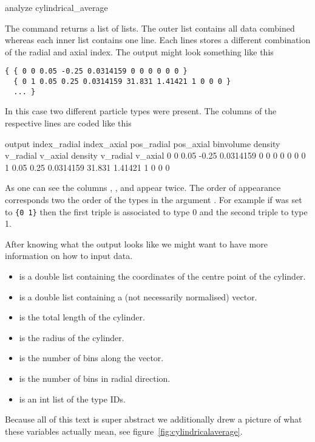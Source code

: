 \begin{essyntax}
  analyze cylindrical_average  
     
\end{essyntax}

The command returns a list of lists.  The outer list contains all data
combined whereas each inner list contains one line.  Each lines stores
a different combination of the radial and axial index.  The output
might look something like this
\begin{verbatim}
{ { 0 0 0.05 -0.25 0.0314159 0 0 0 0 0 0 }
  { 0 1 0.05 0.25 0.0314159 31.831 1.41421 1 0 0 0 }
  ... }
\end{verbatim}
In this case two different particle types were present.  The columns
of the respective lines are coded like this
\begin{SaveVerbatim}{output}
index_radial index_axial pos_radial pos_axial binvolume density v_radial v_axial density v_radial v_axial
0            0           0.05       -0.25     0.0314159 0       0        0       0       0        0
0            1           0.05       0.25      0.0314159 31.831  1.41421  1       0       0        0
\end{SaveVerbatim}
\bigbreak\noindent%
\bigbreak\noindent%
%
As one can see the columns , , and
 appear twice.  The order of appearance corresponds
two the order of the types in the argument .  For example
if  was set to \Verb|{0 1}| then the first triple is
associated to type 0 and the second triple to type 1.

After knowing what the output looks like we might want to have more
information on how to input data.
\begin{itemize}
\item {} is a double list containing the coordinates of the
  centre point of the cylinder.
\item {} is a double list containing a (not necessarily
  normalised) vector.
\item {} is the total length of the cylinder.
\item {} is the radius of the cylinder.
\item {} is the number of bins along the 
  vector.
\item {} is the number of bins in radial direction.
\item {} is an int list of the type IDs.
\end{itemize}
Because all of this text is super abstract we additionally drew a
picture of what these variables actually mean, see
figure~\ref{fig:cylindricalaverage}.

